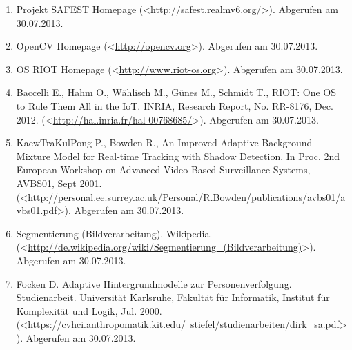 \documentclass[10pt,a4paper]{article}
\begin{document}
\begin{enumerate} 

\item Projekt SAFEST Homepage (\textless\href{http://safest.realmv6.org/}{http://safest.realmv6.org/}\textgreater). \newline 
Abgerufen am 30.07.2013.

\item OpenCV Homepage (\textless\href{http://opencv.org}{http://opencv.org}\textgreater). Abgerufen am 30.07.2013.

\item OS RIOT Homepage (\textless\href{http://www.riot-os.org}{http://www.riot-os.org}\textgreater). Abgerufen am 30.07.2013.

\item Baccelli E., Hahm O., Wählisch M., Günes M., Schmidt T., RIOT: One OS to Rule Them All in the IoT. INRIA, Research Report, No. RR-8176, Dec. 2012. \newline (\textless\href{http://hal.inria.fr/hal-00768685/}{http://hal.inria.fr/hal-00768685/}\textgreater). Abgerufen am 30.07.2013.

\item KaewTraKulPong P., Bowden R., An Improved Adaptive Background Mixture Model for Real-time Tracking with Shadow Detection. In Proc. 2nd European Workshop on Advanced Video Based Surveillance Systems, AVBS01, Sept 2001. \newline (\textless\href{http://personal.ee.surrey.ac.uk/Personal/R.Bowden/publications/avbs01/avbs01.pdf}{http://personal.ee.surrey.ac.uk/Personal/R.Bowden/publications/avbs01/avbs01.pdf}\textgreater). Abgerufen am 30.07.2013.

\item Segmentierung (Bildverarbeitung). Wikipedia. \newline (\textless\href{http://de.wikipedia.org/wiki/Segmentierung\_(Bildverarbeitung)}{http://de.wikipedia.org/wiki/Segmentierung\_(Bildverarbeitung)}\textgreater). \newline
Abgerufen am 30.07.2013.

\item Focken D. Adaptive Hintergrundmodelle zur Personenverfolgung. Studienarbeit. Universität Karlsruhe, Fakultät für Informatik, Institut für Komplexität und Logik, Jul. 2000. \newline (\textless\href{https://cvhci.anthropomatik.kit.edu/~stiefel/studienarbeiten/dirk\_sa.pdf}{https://cvhci.anthropomatik.kit.edu/~stiefel/studienarbeiten/dirk\_sa.pdf}\textgreater). Abgerufen am 30.07.2013.

\end{enumerate}
\end{document}
